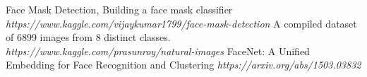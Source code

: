 \begin{thebibliography}{9}
Face Mask Detection, Building a face mask classifier
\textit{https://www.kaggle.com/vijaykumar1799/face-mask-detection}
A compiled dataset of 6899 images from 8 distinct classes.
\textit{https://www.kaggle.com/prasunroy/natural-images}
FaceNet: A Unified Embedding for Face Recognition and Clustering
\textit{https://arxiv.org/abs/1503.03832}
\end{thebibliography}

